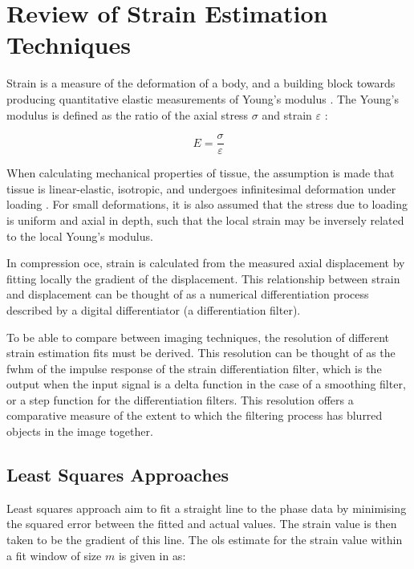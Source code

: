 \chapter{Review of Strain Estimation Techniques}\label{review}

Strain is a measure of the deformation of a body, and a building block towards producing quantitative elastic measurements of Young's modulus \cite{wang_optical_2015}. The Young's modulus is defined as the ratio of the axial stress $\sigma$ and strain $\varepsilon$ \cite{kennedy_review_2014}:

\begin{equation}
	E = \frac{\sigma}{\varepsilon}
	\label{youngs_modulus}
\end{equation}

When calculating mechanical properties of tissue, the assumption is made that tissue is linear-elastic, isotropic, and undergoes infinitesimal deformation under loading \cite{kennedy_review_2014}. For small deformations, it is also assumed that the stress due to loading is uniform and axial in depth, such that the local strain may be inversely related to the local Young's modulus.

In compression \ac{oce}, strain is calculated from the measured axial displacement by fitting locally the gradient of the displacement. This relationship between strain and displacement can be thought of as a numerical differentiation process \cite{luo_axial_2004} described by a digital differentiator (a differentiation filter).

To be able to compare between imaging techniques, the resolution of different strain estimation fits must be derived. This resolution can be thought of as the \ac{fwhm} of the impulse response of the strain differentiation filter, which is the output when the input signal is a delta function in the case of a smoothing filter, or a step function for the differentiation filters. This resolution offers a comparative measure of the extent to which the filtering process has blurred objects in the image together. 

\section{Least Squares Approaches}\label{least_squares}
Least squares approach aim to fit a straight line to the phase data by minimising the squared error between the fitted and actual values. The strain value is then taken to be the gradient of this line. The \ac{ols} estimate for the strain value within a fit window of size $m$ is given in \cite{kennedy_strain_2012} as:

